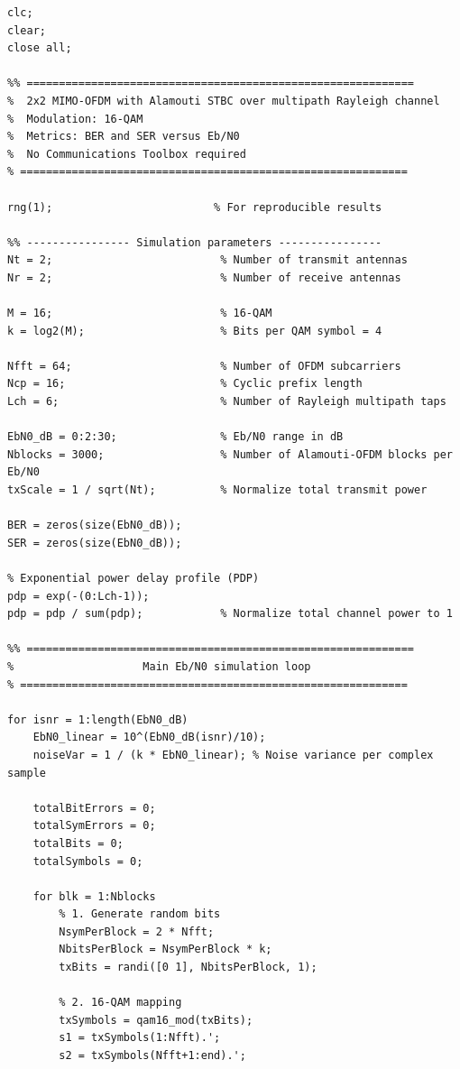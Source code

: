 \documentclass[a4paper]{article}
\begin{document}
\begin{lstlisting}[style=matlabstyle]
clc;
clear;
close all;

%% ============================================================
%  2x2 MIMO-OFDM with Alamouti STBC over multipath Rayleigh channel
%  Modulation: 16-QAM
%  Metrics: BER and SER versus Eb/N0
%  No Communications Toolbox required
% ============================================================

rng(1);                         % For reproducible results

%% ---------------- Simulation parameters ----------------
Nt = 2;                          % Number of transmit antennas
Nr = 2;                          % Number of receive antennas

M = 16;                          % 16-QAM
k = log2(M);                     % Bits per QAM symbol = 4

Nfft = 64;                       % Number of OFDM subcarriers
Ncp = 16;                        % Cyclic prefix length
Lch = 6;                         % Number of Rayleigh multipath taps

EbN0_dB = 0:2:30;                % Eb/N0 range in dB
Nblocks = 3000;                  % Number of Alamouti-OFDM blocks per Eb/N0
txScale = 1 / sqrt(Nt);          % Normalize total transmit power

BER = zeros(size(EbN0_dB));
SER = zeros(size(EbN0_dB));

% Exponential power delay profile (PDP)
pdp = exp(-(0:Lch-1));
pdp = pdp / sum(pdp);            % Normalize total channel power to 1

%% ============================================================
%                    Main Eb/N0 simulation loop
% ============================================================

for isnr = 1:length(EbN0_dB)
    EbN0_linear = 10^(EbN0_dB(isnr)/10);
    noiseVar = 1 / (k * EbN0_linear); % Noise variance per complex sample

    totalBitErrors = 0;
    totalSymErrors = 0;
    totalBits = 0;
    totalSymbols = 0;

    for blk = 1:Nblocks
        % 1. Generate random bits
        NsymPerBlock = 2 * Nfft;
        NbitsPerBlock = NsymPerBlock * k;
        txBits = randi([0 1], NbitsPerBlock, 1);

        % 2. 16-QAM mapping
        txSymbols = qam16_mod(txBits);
        s1 = txSymbols(1:Nfft).';
        s2 = txSymbols(Nfft+1:end).';


\end{lstlisting}
\end{document}
